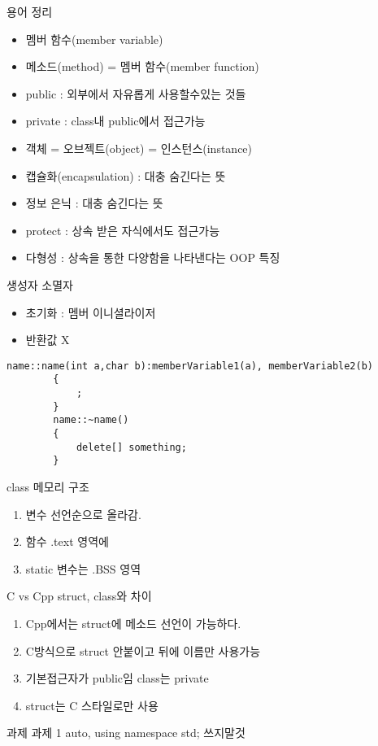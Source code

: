 \documentclass[10pt]{beamer}
\begin{document}
\begin{frame}{용어 정리}
    \begin{itemize}
        \item 멤버 함수(member variable)
        \item 메소드(method) = 멤버 함수(member function)
        \item public : 외부에서 자유롭게 사용할수있는 것들
        \item private : class내 public에서 접근가능
        \item 객체 = 오브젝트(object) = 인스턴스(instance)
        \item 캡슐화(encapsulation) : 대충 숨긴다는 뜻
        \item 정보 은닉 : 대충 숨긴다는 뜻
        \item protect : 상속 받은 자식에서도 접근가능
        \item 다형성 : 상속을 통한 다양함을 나타낸다는 OOP 특징
    \end{itemize}
\end{frame}    

\begin{frame}[fragile]{생성자 소멸자}
    \begin{itemize}
        \item 초기화 : 멤버 이니셜라이저
        \item 반환값 X
    \end{itemize}
    
    \begin{lstlisting}[style = CStyle]
        name::name(int a,char b):memberVariable1(a), memberVariable2(b)
        {
            ;
        }
        name::~name()
        {
            delete[] something;
        }
    \end{lstlisting}
\end{frame}    


\begin{frame}{class 메모리 구조}
    \begin{enumerate}
        \item 변수 선언순으로 올라감.
        \item 함수 .text 영역에
        \item static 변수는 .BSS 영역
    \end{enumerate}
\end{frame}    

\begin{frame}{C vs Cpp struct, class와 차이}
    \begin{enumerate}
        \item Cpp에서는 struct에 메소드 선언이 가능하다.
        \item C방식으로 struct 안붙이고 뒤에 이름만 사용가능
        \item 기본접근자가 public임 class는 private
        \item struct는 C 스타일로만 사용
    \end{enumerate}
\end{frame}    



\begin{frame}{과제}
    과제 1
    auto, using namespace std; 쓰지말것
\end{frame}    
\end{document}
